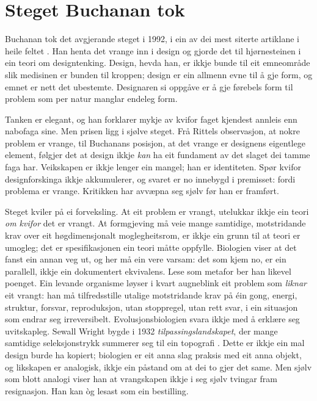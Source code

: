 \section{Steget Buchanan tok}

Buchanan tok det avgjerande steget i 1992, i ein av dei mest siterte artiklane i heile feltet \autocite{buchanan1992wicked}. Han henta det vrange inn i design og gjorde det til hjørnesteinen i ein teori om designtenking. Design, hevda han, er ikkje bunde til eit emneområde slik medisinen er bunden til kroppen; design er ein allmenn evne til å gje form, og emnet er nett det ubestemte. Designaren si oppgåve er å gje førebels form til problem som per natur manglar endeleg form.

Tanken er elegant, og han forklarer mykje av kvifor faget kjendest annleis enn nabofaga sine. Men prisen ligg i sjølve steget. Frå Rittels observasjon, at nokre problem er vrange, til Buchanans posisjon, at det vrange er designens eigentlege element, følgjer det at design ikkje \emph{kan} ha eit fundament av det slaget dei tamme faga har. Veikskapen er ikkje lenger ein mangel; han er identiteten. Spør kvifor designforskinga ikkje akkumulerer, og svaret er no innebygd i premisset: fordi problema er vrange. Kritikken har avvæpna seg sjølv før han er framført.

Steget kviler på ei forveksling. At eit problem er vrangt, utelukkar ikkje ein teori \emph{om kvifor} det er vrangt. At formgjeving må veie mange samtidige, motstridande krav over eit høgdimensjonalt moglegheitsrom, er ikkje ein grunn til at teori er umogleg; det er spesifikasjonen ein teori måtte oppfylle. Biologien viser at det fanst ein annan veg ut, og her må ein vere varsam: det som kjem no, er ein parallell, ikkje ein dokumentert ekvivalens. Lese som metafor ber han likevel poenget. Ein levande organisme løyser i kvart augneblink eit problem som \emph{liknar} eit vrangt: han må tilfredsstille utalige motstridande krav på éin gong, energi, struktur, forsvar, reproduksjon, utan stoppregel, utan rett svar, i ein situasjon som endrar seg irreversibelt. Evolusjonsbiologien svara ikkje med å erklære seg uvitskapleg. Sewall Wright bygde i 1932 \emph{tilpassingslandskapet}, der mange samtidige seleksjonstrykk summerer seg til ein topografi \autocite{wright1932}. Dette er ikkje ein mal design burde ha kopiert; biologien er eit anna slag praksis med eit anna objekt, og likskapen er analogisk, ikkje ein påstand om at dei to gjer det same. Men sjølv som blott analogi viser han at vrangskapen ikkje i seg sjølv tvingar fram resignasjon. Han kan òg lesast som ein bestilling.

